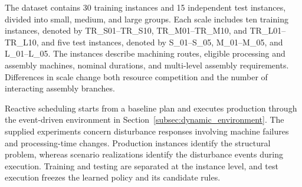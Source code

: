 The dataset contains 30 training instances and 15 independent test instances, divided into small,
medium, and large groups. Each scale includes ten training instances, denoted by TR\_S01--TR\_S10,
TR\_M01--TR\_M10, and TR\_L01--TR\_L10, and five test instances, denoted by S\_01--S\_05, M\_01--M\_05,
and L\_01--L\_05. The instances describe machining routes, eligible processing and assembly machines,
nominal durations, and multi-level assembly requirements. Differences in scale change both resource competition
and the number of interacting assembly branches.


Reactive scheduling starts from a baseline plan and executes production through the event-driven
environment in Section~\ref{subsec:dynamic_environment}. The supplied experiments concern disturbance
responses involving machine failures and processing-time changes. Production instances identify the structural problem,
whereas scenario realizations identify the disturbance events during execution. Training
and testing are separated at the instance level, and test execution freezes the learned policy and its candidate rules.


